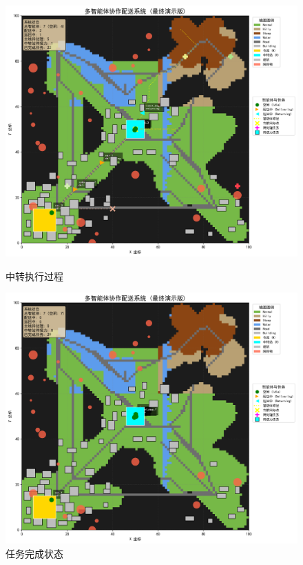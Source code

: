 \documentclass[12pt,a4paper]{article}
\begin{document}
\begin{figure}[h]
    \centering
    \begin{minipage}[t]{0.4\textwidth}
        \centering
        \includegraphics[width=\textwidth]{visualization_snapshots/4.png}
        \caption{中转执行过程}
    \end{minipage}
    \hfill
    \begin{minipage}[t]{0.4\textwidth}
        \centering
        \includegraphics[width=\textwidth]{visualization_snapshots/5.png}
        \caption{任务完成状态}
    \end{minipage}
    
    \label{fig:visualization-snapshots-2}
\end{figure}
\end{document}
